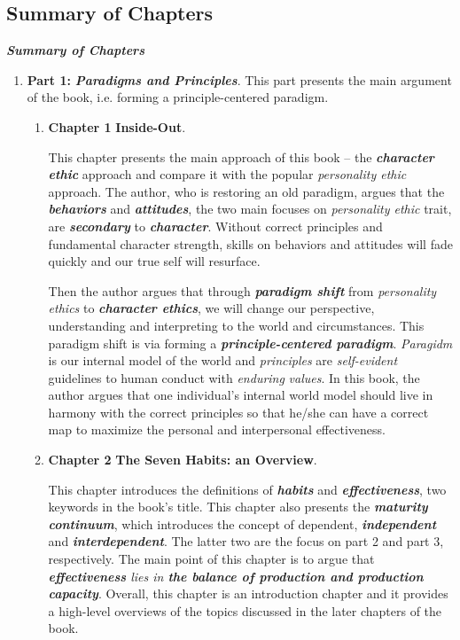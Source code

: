 \documentclass[11pt]{article}
\begin{document}
\subsection{Summary of Chapters}
\emph{\textbf{Summary of Chapters}}
\begin{enumerate}
\item  \textbf{Part 1: } \emph{\textbf{Paradigms and Principles}}. This part presents the main argument of the book, i.e. forming a principle-centered paradigm. 
\begin{enumerate}
\item \textbf{Chapter 1} \textbf{Inside-Out}. 

This chapter presents the main approach of this book -- the \emph{\textbf{character ethic}} approach and compare it with the popular \emph{personality ethic} approach. The author, who is restoring an old paradigm, argues that the \emph{\textbf{behaviors}} and \emph{\textbf{attitudes}}, the two main focuses on \emph{personality ethic} trait, are \emph{\textbf{secondary}} to \emph{\textbf{character}}. Without correct principles and fundamental character strength, skills on behaviors and attitudes will fade quickly and our true self will resurface. 

Then the author argues that through \emph{\textbf{paradigm shift}} from \emph{personality ethics} to \emph{\textbf{character ethics}}, we will change our perspective, understanding and interpreting to the world and circumstances. This paradigm shift is via forming a \emph{\textbf{principle-centered paradigm}}. \emph{Paragidm} is our internal model of the world and \emph{principles} are \emph{self-evident} guidelines to human conduct with \emph{enduring} \emph{values}. In this book, the author argues that one individual's internal world model should live in harmony with the correct principles so that he/she can have a correct map to maximize the personal and interpersonal effectiveness.

\item \textbf{Chapter 2} \textbf{The Seven Habits: an Overview}.

This chapter introduces the definitions of \emph{\textbf{habits}} and \emph{\textbf{effectiveness}}, two keywords in the book's title. This chapter also presents the \emph{\textbf{maturity continuum}}, which introduces the concept of dependent, \emph{\textbf{independent}} and \emph{\textbf{interdependent}}. The latter two are the focus on part 2 and part 3, respectively.  The main point of this chapter is to argue that \emph{\textbf{effectiveness} lies in \textbf{the balance of production and production capacity}}. Overall, this chapter is an introduction chapter  and it provides a high-level overviews of the topics discussed in the later chapters of the book.
\end{enumerate}



\end{enumerate}
\end{document}
